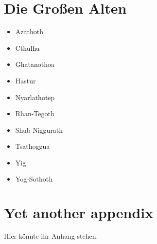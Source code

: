 \chapter{Die Großen Alten}

\begin{itemize}
\item Azathoth
\item Cthulhu
\item Ghatanothoa
\item Hastur
\item Nyarlathotep
\item Rhan-Tegoth
\item Shub-Niggurath
\item Tsathoggua
\item Yig
\item Yog-Sothoth
\end{itemize}

\chapter{Yet another appendix}

Hier könnte ihr Anhang stehen.

